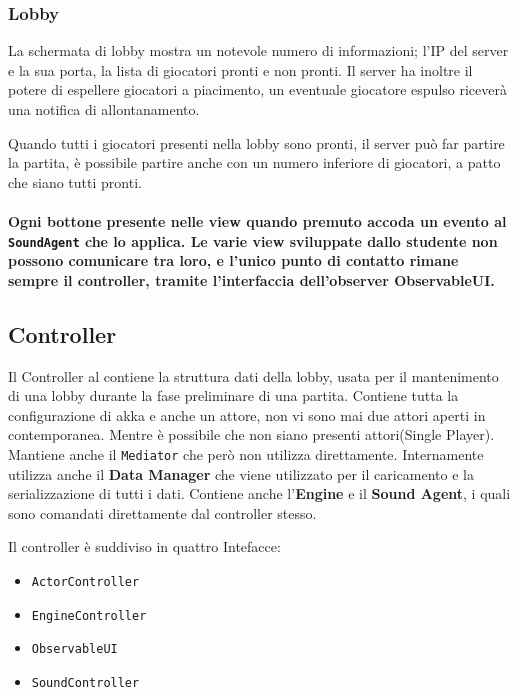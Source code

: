    \subsubsection{Lobby}
        La schermata di lobby mostra un notevole numero di informazioni; l'IP del server e la sua porta, la lista di giocatori pronti e non pronti.
        Il server ha inoltre il potere di espellere giocatori a piacimento, un eventuale giocatore espulso riceverà una notifica di allontanamento.
        
        Quando tutti i giocatori presenti nella lobby sono pronti, il server può far partire la partita, è possibile partire anche con un numero inferiore di giocatori, a patto che siano tutti pronti.
        
        
    \paragraph{Ogni bottone presente nelle view quando premuto accoda un evento al \texttt{SoundAgent} che lo applica.
    Le varie view sviluppate dallo studente non possono comunicare tra loro, e l'unico punto di contatto rimane sempre il controller, tramite l'interfaccia dell'observer ObservableUI.}

    \subsection{Controller}
        Il Controller al contiene la struttura dati della lobby, usata per il mantenimento di una lobby durante la fase
        preliminare di una partita.
        Contiene tutta la configurazione di akka e anche un attore,
        non vi sono mai due attori aperti in contemporanea.
        Mentre è possibile che non siano presenti attori(Single Player).
        Mantiene anche il \texttt{Mediator} che però non utilizza direttamente.
        Internamente utilizza anche il \textbf{Data Manager} che viene utilizzato per il caricamento e la serializzazione di tutti i dati.
        Contiene anche l'\textbf{Engine} e il \textbf{Sound Agent}, i quali sono comandati direttamente dal controller stesso.
        
        Il controller è suddiviso in quattro Intefacce:
        \begin{itemize}
	        \item \texttt{ActorController}
	        \item \texttt{EngineController}
	        \item \texttt{ObservableUI}
        	\item \texttt{SoundController}
        \end{itemize}
        
